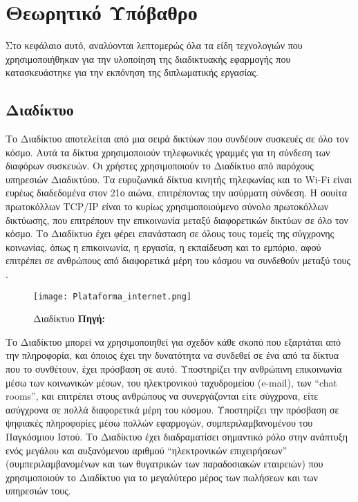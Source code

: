 \chapter{Θεωρητικό Υπόβαθρο}
Στο κεφάλαιο αυτό, αναλύονται λεπτομερώς όλα τα είδη τεχνολογιών που χρησιμοποιήθηκαν για την υλοποίηση της διαδικτυακής εφαρμογής που κατασκευάστηκε για την εκπόνηση της διπλωματικής εργασίας.

\section{Διαδίκτυο}
Το Διαδίκτυο αποτελείται από μια σειρά δικτύων που συνδέουν συσκευές σε όλο τον κόσμο. Αυτά τα δίκτυα χρησιμοποιούν τηλεφωνικές γραμμές για τη σύνδεση των διαφόρων συσκευών. Οι χρήστες χρησιμοποιούν το Διαδίκτυο από παρόχους υπηρεσιών Διαδικτύου. Τα ευρυζωνικά δίκτυα κινητής τηλεφωνίας και το Wi-Fi είναι ευρέως διαδεδομένα στον 21ο αιώνα, επιτρέποντας την ασύρματη σύνδεση. Η σουίτα πρωτοκόλλων TCP/IP είναι το κυρίως χρησιμοποιούμενο σύνολο πρωτοκόλλων δικτύωσης, που επιτρέπουν την επικοινωνία μεταξύ διαφορετικών δικτύων σε όλο τον κόσμο. Το Διαδίκτυο έχει φέρει επανάσταση σε όλους τους τομείς της σύγχρονης κοινωνίας, όπως η επικοινωνία, η εργασία, η εκπαίδευση και το εμπόριο, αφού επιτρέπει σε ανθρώπους από διαφορετικά μέρη του κόσμου να συνδεθούν μεταξύ τους \cite{internet_britannica}.

\begin{figure}[ht]
	\centering
	\texttt{[image: Plataforma\_internet.png]}
	\caption[{Διαδίκτυο}]{Διαδίκτυο \textbf{Πηγή:} \cite{fig_Plataforma_internet}}
	\label{fig:Plataforma_internet}
\end{figure}

Το Διαδίκτυο μπορεί να χρησιμοποιηθεί για σχεδόν κάθε σκοπό που εξαρτάται από την πληροφορία, και όποιος έχει την δυνατότητα να συνδεθεί σε ένα από τα δίκτυα που το συνθέτουν, έχει πρόσβαση σε αυτό. Υποστηρίζει την ανθρώπινη επικοινωνία μέσω των κοινωνικών μέσων, του ηλεκτρονικού ταχυδρομείου (e-mail), των ``chat rooms'', και επιτρέπει στους ανθρώπους να συνεργάζονται είτε σύγχρονα, είτε ασύγχρονα σε πολλά διαφορετικά μέρη του κόσμου. Υποστηρίζει την πρόσβαση σε ψηφιακές πληροφορίες μέσω πολλών εφαρμογών, συμπεριλαμβανομένου του Παγκόσμιου Ιστού. Το Διαδίκτυο έχει διαδραματίσει σημαντικό ρόλο στην ανάπτυξη ενός μεγάλου και αυξανόμενου αριθμού ``ηλεκτρονικών επιχειρήσεων'' (συμπεριλαμβανομένων και των θυγατρικών των παραδοσιακών εταιρειών) που χρησιμοποιούν το Διαδίκτυο για το μεγαλύτερο μέρος των πωλήσεων και των υπηρεσιών τους.

